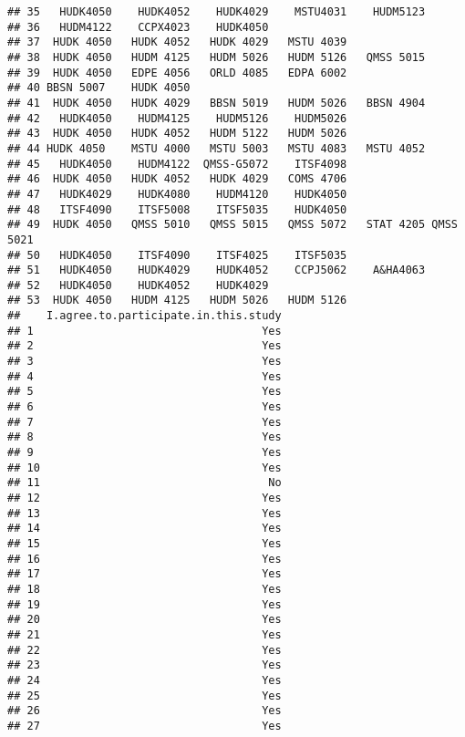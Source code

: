 \documentclass[]{article}
\begin{document}
\begin{verbatim}
## 35   HUDK4050    HUDK4052    HUDK4029    MSTU4031    HUDM5123          
## 36   HUDM4122    CCPX4023    HUDK4050                                  
## 37  HUDK 4050   HUDK 4052   HUDK 4029   MSTU 4039                      
## 38  HUDK 4050   HUDM 4125   HUDM 5026   HUDM 5126   QMSS 5015          
## 39  HUDK 4050   EDPE 4056   ORLD 4085   EDPA 6002                      
## 40 BBSN 5007    HUDK 4050                                              
## 41  HUDK 4050   HUDK 4029   BBSN 5019   HUDM 5026   BBSN 4904          
## 42   HUDK4050    HUDM4125    HUDM5126    HUDM5026                      
## 43  HUDK 4050   HUDK 4052   HUDM 5122   HUDM 5026                      
## 44 HUDK 4050    MSTU 4000   MSTU 5003   MSTU 4083   MSTU 4052          
## 45   HUDK4050    HUDM4122  QMSS-G5072    ITSF4098                      
## 46  HUDK 4050   HUDK 4052   HUDK 4029   COMS 4706                      
## 47   HUDK4029    HUDK4080    HUDM4120    HUDK4050                      
## 48   ITSF4090    ITSF5008    ITSF5035    HUDK4050                      
## 49  HUDK 4050   QMSS 5010   QMSS 5015   QMSS 5072   STAT 4205 QMSS 5021
## 50   HUDK4050    ITSF4090    ITSF4025    ITSF5035                      
## 51   HUDK4050    HUDK4029    HUDK4052    CCPJ5062    A&HA4063          
## 52   HUDK4050    HUDK4052    HUDK4029                                  
## 53  HUDK 4050   HUDM 4125   HUDM 5026   HUDM 5126                      
##    I.agree.to.participate.in.this.study
## 1                                   Yes
## 2                                   Yes
## 3                                   Yes
## 4                                   Yes
## 5                                   Yes
## 6                                   Yes
## 7                                   Yes
## 8                                   Yes
## 9                                   Yes
## 10                                  Yes
## 11                                   No
## 12                                  Yes
## 13                                  Yes
## 14                                  Yes
## 15                                  Yes
## 16                                  Yes
## 17                                  Yes
## 18                                  Yes
## 19                                  Yes
## 20                                  Yes
## 21                                  Yes
## 22                                  Yes
## 23                                  Yes
## 24                                  Yes
## 25                                  Yes
## 26                                  Yes
## 27                                  Yes

\end{verbatim}
\end{document}
